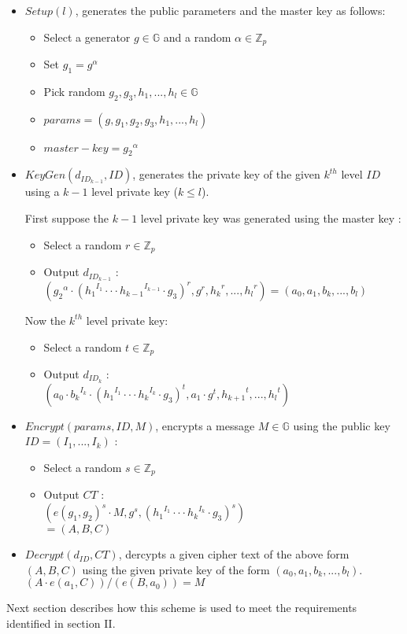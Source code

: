 \begin{itemize}
\item $Setup (l)$, generates the public parameters and the master key as follows:
\begin{itemize}
	\item Select a generator $g \in \mathbb{G}$ and a random $\alpha \in \mathbb{Z}_p$
	\item Set $g_1 = g^{\alpha}$
	\item Pick random $g_2, g_3, h_1, ..., h_l \in \mathbb{G}$
	\item $params = (g, g_1, g_2, g_3, h_1, ..., h_l)$
	\item $master-key = {g_2}^{\alpha}$\\
\end{itemize}	

\item $KeyGen(d_{{ID}_{k-1}}, ID)$, generates the private key of the given $k^{th}$ level $ID$ using a $k-1$ level private key ($k \leq l$).

First suppose the $k-1$ level private key was generated using the master key :
\begin{itemize}
	\item Select a random $r \in \mathbb{Z}_p$ 
	\item Output $d_{{ID}_{k-1}}$ : \\
	$({{g_2}^{\alpha}} \cdot {({{h_1}^{I_1}\cdot \cdot \cdot {h_{k-1}}^{I_{k-1}}} \cdot {g_3} )}^r , g^r, {h_{k}}^r, ... , {h_l}^r) = (a_0, a_1, b_k, ... , b_l)$
\end{itemize}	

Now the $k^{th}$ level private key:
\begin{itemize}
	\item Select a random $t \in \mathbb{Z}_p$ 
	\item Output $d_{{ID}_{k}}$ : \\
	$({{a_0}\cdot{{b_k}^{I_k}}} \cdot {({{h_1}^{I_1}\cdot \cdot \cdot {h_k}^{I_k}} \cdot {g_3} )}^t , {a_1}\cdot{g^t}, {h_{k+1}}^t, ... , {h_l}^t)$\\
\end{itemize}	

\item $Encrypt (params, ID, M)$, encrypts a message $M \in \mathbb{G}$ using the public key $ID = (I_1, ..., I_k)$ :

\begin{itemize}
	\item Select a random $s \in \mathbb{Z}_p$ 
	\item Output $CT$ : \\
	$(e(g_1, g_2)^s \cdot M,  g^s,  {({{h_1}^{I_1}\cdot \cdot \cdot {h_k}^{I_k}} \cdot {g_3} )}^s)$\\$=(A, B, C)$\\
\end{itemize}	


\item $Decrypt (d_{ID}, CT)$, dercypts a given cipher text of the above form $(A, B, C)$ using the given private key of the form $(a_0, a_1, b_k, ... , b_l)$. \\
$(A \cdot e(a_1, C))/(e(B, a_0)) = M$\\
\end{itemize}

Next section describes how this scheme is used to meet the requirements identified in section II.
